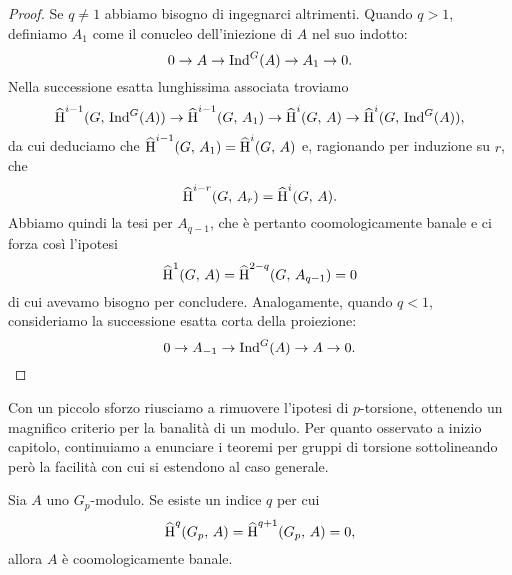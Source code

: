 \begin{proof}
	Se $ q \neq 1 $ abbiamo bisogno di ingegnarci altrimenti. Quando $ q > 1 $, definiamo $ A_1 $ come il conucleo dell'iniezione di $ A $ nel suo indotto:
	\[ 0 \to A \to \operatorname{Ind}^G(A) \to A_1 \to 0. \]
	Nella successione esatta lunghissima associata troviamo
	\[ \operatorname{\widehat{H}}^{i-1}(G, \, \operatorname{Ind}^G(A)) \to \operatorname{\widehat{H}}^{i-1}(G, \, A_1) \to \operatorname{\widehat{H}}^{i}(G, \, A) \to \operatorname{\widehat{H}}^{i}(G, \, \operatorname{Ind}^G(A)),  \]
	da cui deduciamo che $ \operatorname{\widehat{H}}^{i-1}(G, \, A_1) = \operatorname{\widehat{H}}^{i}(G, \, A) $ e, ragionando per induzione su $ r $, che
	\[ \operatorname{\widehat{H}}^{i-r}(G, \, A_r) = \operatorname{\widehat{H}}^{i}(G, \, A). \] 
	Abbiamo quindi la tesi per $ A_{q-1} $, che è pertanto coomologicamente banale e ci forza così l'ipotesi 
	\[ \operatorname{\widehat{H}}^1(G, \, A) = \operatorname{\widehat{H}}^{2-q}(G, \, A_{q-1}) = 0 \]
	di cui avevamo bisogno per concludere.
	Analogamente, quando $ q < 1 $, consideriamo la successione esatta corta della proiezione:
	\[ 0 \to A_{-1} \to \operatorname{Ind}^G(A) \to A \to 0. \]
\end{proof}

Con un piccolo sforzo riusciamo a rimuovere l'ipotesi di $ p $-torsione, ottenendo un magnifico criterio per la banalità di un modulo. Per quanto osservato a inizio capitolo, continuiamo a enunciare i teoremi per gruppi di torsione sottolineando però la facilità con cui si estendono al caso generale.

\begin{theorem}
	Sia $ A $ uno $ G_p $-modulo. Se esiste un indice $ q $ per cui
	\[ \operatorname{\widehat{H}}^q(G_p, \, A) = \operatorname{\widehat{H}}^{q+1}(G_p, \, A) = 0, \]
	allora $ A $ è coomologicamente banale.
\end{theorem}

